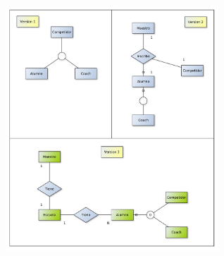 \begin{center}
\includegraphics[width=8cm,keepaspectratio]{./imagenes/des3.pdf}\newline
\end{center}


